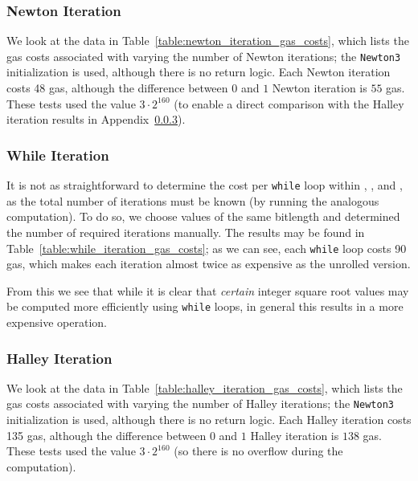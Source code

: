 \subsubsection{Newton Iteration}
\label{app_gas_costs:newton}

We look at the data in Table~\ref{table:newton_iteration_gas_costs},
which lists the gas costs associated with varying
the number of Newton iterations;
the \texttt{Newton3} initialization is used,
although there is no return logic.
Each Newton iteration costs 48 gas,
although the difference between $0$ and $1$ Newton iteration is $55$ gas.
These tests used the value $3\cdot2^{160}$
(to enable a direct comparison with the Halley iteration results
in Appendix~\ref{app_gas_costs:halley}).

\subsubsection{While Iteration}
\label{app_gas_costs:while}

It is not as straightforward to determine the cost per \texttt{while} loop
within \WhileOne{}, \WhileTwo{}, and \WhileThree{},
as the total number of iterations must be known
(by running the analogous computation).
To do so, we choose values of the same bitlength and determined
the number of required iterations manually.
The results may be found in Table~\ref{table:while_iteration_gas_costs};
as we can see,
each \texttt{while} loop costs 90 gas,
which makes each iteration almost twice as expensive
as the unrolled version.

From this we see that while it is clear that \emph{certain}
integer square root values may be computed more efficiently
using \texttt{while} loops,
in general this results in a more expensive operation.

\subsubsection{Halley Iteration}
\label{app_gas_costs:halley}

We look at the data in Table~\ref{table:halley_iteration_gas_costs},
which lists the gas costs associated with varying
the number of Halley iterations;
the \texttt{Newton3} initialization is used,
although there is no return logic.
Each Halley iteration costs 135 gas,
although the difference between $0$ and $1$ Halley iteration is $138$ gas.
These tests used the value $3\cdot2^{160}$
(so there is no overflow during the computation).

